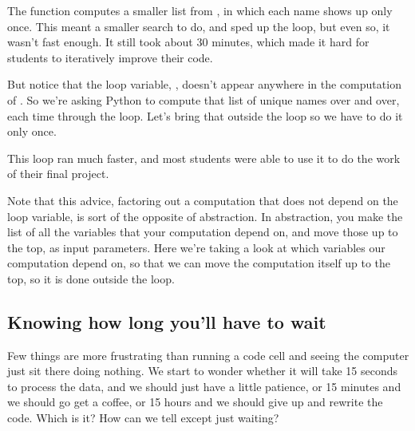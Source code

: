 \documentclass[letterpaper,10pt,english]{sphinxmanual}
\begin{document}
The  function computes a smaller list from , in which each name shows up only once.  This meant a smaller search to do, and sped up the loop, but even so, it wasn’t fast enough.  It still took about 30 minutes, which made it hard for students to iteratively improve their code.

But notice that the loop variable, , doesn’t appear anywhere in the computation of .  So we’re asking Python to compute that list of unique names over and over, each time through the loop.  Let’s bring that outside the loop so we have to do it only once.

\begin{sphinxVerbatim}[commandchars=\\\{\}]
  \PYG{p}{[}\PYG{p}{]}
   \PYG{p}{[}\PYG{p}{]}
       
\end{sphinxVerbatim}

This loop ran much faster, and most students were able to use it to do the work of their final project.

Note that this advice, factoring out a computation that does not depend on the loop variable, is sort of the opposite of abstraction.  In abstraction, you make the list of all the variables that your computation  depend on, and move those up to the top, as input parameters.  Here we’re taking a look at which variables our computation  depend on, so that we can move the computation itself up to the top, so it is done outside the loop.


\subsection{Knowing how long you’ll have to wait}
\label{\detokenize{chapter-11-processing-rows:knowing-how-long-you-ll-have-to-wait}}
Few things are more frustrating than running a code cell and seeing the computer just sit there doing nothing.  We start to wonder whether it will take 15 seconds to process the data, and we should just have a little patience, or 15 minutes and we should go get a coffee, or 15 hours and we should give up and rewrite the code.  Which is it?  How can we tell except just waiting?
\end{document}
